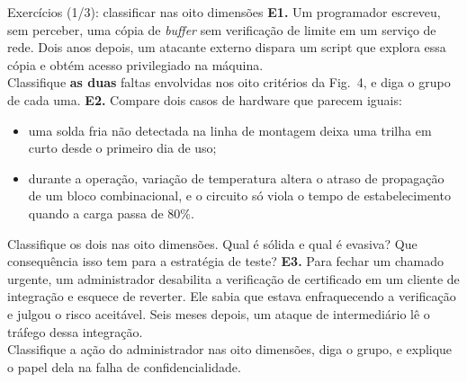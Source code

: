 \documentclass{beamer}
\begin{document}
\begin{frame}{Exerc\'icios (1/3): classificar nas oito dimens\~oes}
    \footnotesize
    \textbf{E1.} Um programador escreveu, sem perceber, uma c\'opia de \textit{buffer} sem verifica\c{c}\~ao de limite em um servi\c{c}o de rede. Dois anos depois, um atacante externo dispara um script que explora essa c\'opia e obt\'em acesso privilegiado na m\'aquina.\\
    Classifique \textbf{as duas} faltas envolvidas nos oito crit\'erios da Fig.\ 4, e diga o grupo de cada uma.
    \medskip
    \textbf{E2.} Compare dois casos de hardware que parecem iguais:
    \begin{itemize}
        \item[(a)] uma solda fria n\~ao detectada na linha de montagem deixa uma trilha em curto desde o primeiro dia de uso;
        \item[(b)] durante a opera\c{c}\~ao, varia\c{c}\~ao de temperatura altera o atraso de propaga\c{c}\~ao de um bloco combinacional, e o circuito s\'o viola o tempo de estabelecimento quando a carga passa de 80\%.
    \end{itemize}
    Classifique os dois nas oito dimens\~oes. Qual \'e s\'olida e qual \'e evasiva? Que consequ\^encia isso tem para a estrat\'egia de teste?
    \medskip
    \textbf{E3.} Para fechar um chamado urgente, um administrador desabilita a verifica\c{c}\~ao de certificado em um cliente de integra\c{c}\~ao e esquece de reverter. Ele sabia que estava enfraquecendo a verifica\c{c}\~ao e julgou o risco aceit\'avel. Seis meses depois, um ataque de intermedi\'ario l\^e o tr\'afego dessa integra\c{c}\~ao.\\
    Classifique a a\c{c}\~ao do administrador nas oito dimens\~oes, diga o grupo, e explique o papel dela na falha de confidencialidade.
\end{frame}
\end{document}
